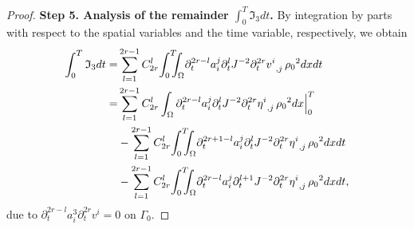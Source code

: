 \documentclass[12pt,twoside,reqno]{amsart}
\numberwithin{equation}{section}
\theoremstyle{definition}
\theoremstyle{remark}
\begin{document}
\begin{proof}
\textbf{Step 5. Analysis of the remainder $\int_0^T{\mathfrak{I}}_3dt$.}
By integration by parts with respect to the spatial variables and the time variable, respectively, we obtain
\begin{align}
  \int_0^T{\mathfrak{I}}_3dt=&\sum_{l=1}^{2r-1}C_{2r}^l{\int_0^T\!\!\!\!\int_\Omega }  {\partial}_t^{2r-l}a_i^j {\partial}_t^l J^{-2}{{{{\partial}_t^{2r}v^i}}_{,{j}}\,}{\rho_0}^2  dxdt{\nonumber}\\
  =&\sum_{l=1}^{2r-1}C_{2r}^l\int_\Omega {\partial}_t^{2r-l}a_i^j {\partial}_t^l J^{-2}{{{{\partial}_t^{2r}\eta^i}}_{,{j}}\,}{\rho_0}^2  dx\Big|_0^T\label{eq.2r.46}\\
  &-\sum_{l=1}^{2r-1}C_{2r}^l{\int_0^T\!\!\!\!\int_\Omega }  {\partial}_t^{2r+1-l}a_i^j {\partial}_t^l J^{-2}{{{{\partial}_t^{2r}\eta^i}}_{,{j}}\,}{\rho_0}^2  dxdt\label{eq.2r.47}\\
  &-\sum_{l=1}^{2r-1}C_{2r}^l{\int_0^T\!\!\!\!\int_\Omega }  {\partial}_t^{2r-l}a_i^j {\partial}_t^{l+1} J^{-2} {{{{\partial}_t^{2r}\eta^i}}_{,{j}}\,}{\rho_0}^2  dxdt,\label{eq.2r.48}
\end{align}
due to ${\partial}_t^{2r-l}a_i^3{\partial}_t^{2r}v^i=0$ on $\Gamma_0$.


\end{proof}
\end{document}
